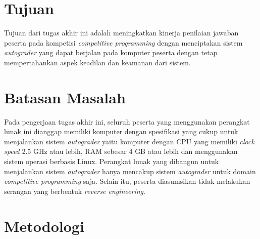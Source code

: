 \section{Tujuan}

\par Tujuan dari tugas akhir ini adalah meningkatkan kinerja penilaian jawaban peserta pada kompetisi \textit{competitive programming} dengan menciptakan sistem \textit{autograder} yang dapat berjalan pada komputer peserta dengan tetap mempertahankan aspek keadilan dan keamanan dari sistem.

\section{Batasan Masalah}

\par Pada pengerjaan tugas akhir ini, seluruh peserta yang menggunakan perangkat lunak ini dianggap memiliki komputer dengan spesifikasi yang cukup untuk menjalankan sistem \textit{autograder} yaitu komputer dengan CPU yang memiliki \textit{clock speed} 2.5 GHz atau lebih, RAM sebesar 4 GB atau lebih dan menggunakan sistem operasi berbasis Linux. Perangkat lunak yang dibangun untuk menjalankan sistem \textit{autograder} hanya mencakup sistem \textit{autograder} untuk domain \textit{competitive programming} saja. Selain itu, peserta diasumsikan tidak melakukan serangan yang berbentuk \textit{reverse engineering}.

\section{Metodologi}

